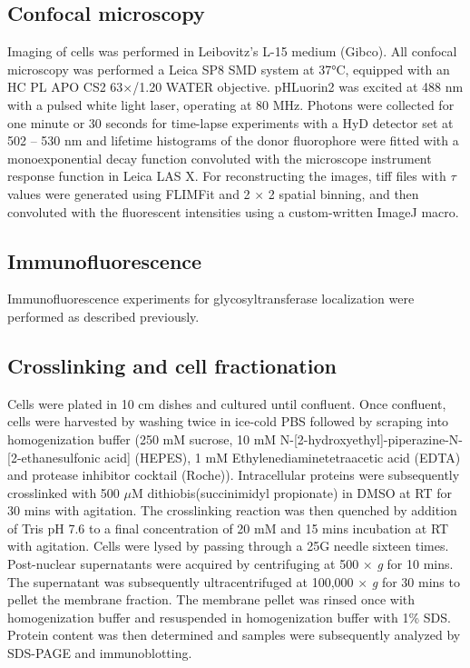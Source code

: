 \subsection{Confocal microscopy}

Imaging of cells was performed in Leibovitz’s L-15 medium (Gibco). All confocal microscopy was performed a Leica SP8 SMD system at 37°C, equipped with an HC PL APO CS2 63$\times$/1.20 WATER objective. pHLuorin2 was excited at 488 nm with a pulsed white light laser, operating at 80 MHz. Photons were collected for one minute or 30 seconds for time-lapse experiments with a HyD detector set at 502 – 530 nm and lifetime histograms of the donor fluorophore were fitted with a monoexponential decay function convoluted with the microscope instrument response function in Leica LAS X. For reconstructing the images, tiff files with $\tau$ values were generated using FLIMFit\cite{warren_rapid_2013} and 2 $\times$ 2 spatial binning, and then convoluted with the fluorescent intensities using a custom-written ImageJ macro.

\subsection{Immunofluorescence}

Immunofluorescence experiments for glycosyltransferase localization were performed as described previously\cite{linders_congenital_2020}.

\subsection{Crosslinking and cell fractionation}

Cells were plated in 10 cm dishes and cultured until confluent. Once confluent, cells were harvested by washing twice in ice-cold PBS followed by scraping into homogenization buffer (250 mM sucrose, 10 mM N-[2-hydroxyethyl]-piperazine-N-[2-ethanesulfonic acid] (HEPES), 1 mM Ethylenediaminetetraacetic acid (EDTA) and protease inhibitor cocktail (Roche)). Intracellular proteins were subsequently crosslinked with 500 $\mu$M dithiobis(succinimidyl propionate) in DMSO at RT for 30 mins with agitation. The crosslinking reaction was then quenched by addition of Tris pH 7.6 to a final concentration of 20 mM and 15 mins incubation at RT with agitation. Cells were lysed by passing through a 25G needle sixteen times. Post-nuclear supernatants were acquired by centrifuging at 500 $\times$ \emph{g} for 10 mins. The supernatant was subsequently ultracentrifuged at 100,000 $\times$ \emph{g} for 30 mins to pellet the membrane fraction. The membrane pellet was rinsed once with homogenization buffer and resuspended in homogenization buffer with 1\% SDS. Protein content was then determined and samples were subsequently analyzed by SDS-PAGE and immunoblotting.

